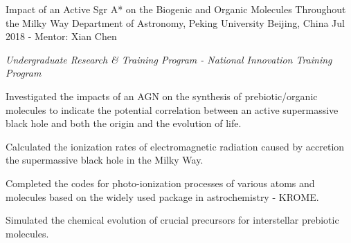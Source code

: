 


\begin{cvexperiences}


\cvexperience
{Impact of an Active Sgr A* on the Biogenic and Organic Molecules Throughout the Milky Way} %
{Department of Astronomy, Peking University} %
{Beijing, China} %
{Jul 2018 - } %
{Mentor: Xian Chen}
{ %
\begin{cvitems}
\item {\textit{Undergraduate Research \& Training Program - National Innovation Training Program}}
\item {Investigated the impacts of an AGN on the synthesis of prebiotic/organic molecules to indicate the potential correlation between an active supermassive black hole and both the origin and the evolution of life.}
\item {Calculated the ionization rates of electromagnetic radiation caused by accretion the supermassive black hole in the Milky Way.}
\item {Completed the codes for photo-ionization processes of various atoms and molecules based on the widely used package in astrochemistry - KROME.}
\item {Simulated the chemical evolution of crucial precursors for interstellar prebiotic molecules.}
\end{cvitems}
}


\end{cvexperiences}
